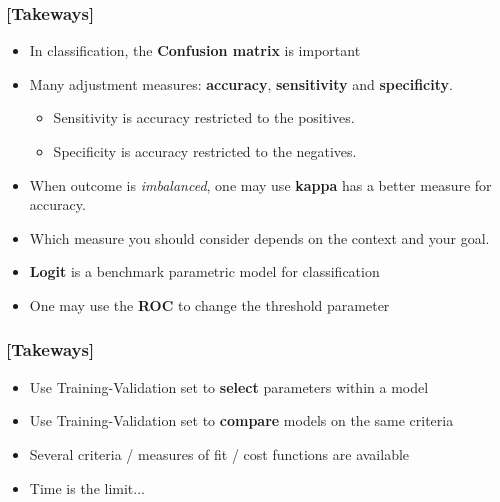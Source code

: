 \documentclass[xcolor=x11names,compress]{beamer}
\renewcommand{\(}{\begin{columns}}
\renewcommand{\)}{\end{columns}}
\newcommand{\<}[1]{\begin{column}{#1}}
\renewcommand{\>}{\end{column}}
\begin{document}
\begin{frame} %
\frametitle{\textcolor{brique}{[Takeways]}}
\begin{itemize}[<+->]
  \item In classification, the \textbf{Confusion matrix} is important
 \item Many adjustment measures:  \textbf{accuracy}, \textbf{sensitivity} and \textbf{specificity}.
    \begin{itemize}[<+->]
      \item Sensitivity is accuracy restricted to the positives.
      \item Specificity is accuracy restricted to the negatives.
   \end{itemize}
 \item When  outcome is \textit{imbalanced}, one may use \textbf{kappa} has a better measure for accuracy.
  \item[] Which measure you should consider depends on the context and your goal.
 \item \textbf{Logit} is a benchmark parametric model for classification
 \item[] One may use the \textbf{ROC} to change the threshold parameter
\end{itemize}
\end{frame}

\begin{frame} %
\frametitle{\textcolor{brique}{[Takeways]}}
\begin{itemize}[<+->]
  \item Use Training-Validation set to \textbf{select} parameters within a model
  \item Use Training-Validation set to \textbf{compare} models on the same criteria
  \item Several criteria / measures of fit / cost functions are available
  \item Time is the limit...
\end{itemize}
\end{frame}

\end{document}
